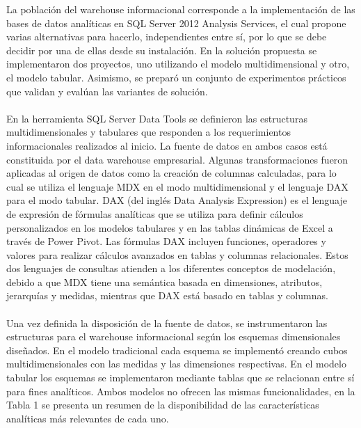 \documentclass[preprint,12pt]{elsarticle}
\begin{document}
La  población  del  warehouse  informacional  corresponde  a  la  implementación  de  las  bases  de  datos analíticas  en  SQL  Server  2012  Analysis  Services,  el  cual  propone  varias  alternativas  para  hacerlo, independientes entre sí, por lo que se debe decidir por una de ellas desde su instalación. En la solución propuesta se implementaron dos proyectos, uno utilizando el modelo multidimensional y otro, el modelo tabular. Asimismo, se preparó un conjunto de experimentos prácticos que validan y evalúan las variantes de solución.  \\ 
\\
En la herramienta SQL Server Data Tools se definieron las estructuras multidimensionales y tabulares que responden a los requerimientos informacionales realizados al inicio. La fuente de datos en ambos casos está constituida por el data warehouse empresarial. Algunas transformaciones fueron aplicadas al origen de datos como la creación de columnas calculadas, para lo cual se utiliza el lenguaje MDX en el modo multidimensional y el lenguaje DAX para el modo tabular. DAX (del inglés Data Analysis Expression) es el lenguaje de expresión de fórmulas analíticas que se utiliza para definir cálculos personalizados en los modelos  tabulares  y en  las  tablas  dinámicas de  Excel  a  través de  Power  Pivot.  Las  fórmulas  DAX incluyen  funciones,  operadores  y  valores  para  realizar  cálculos  avanzados  en  tablas  y  columnas relacionales. Estos dos lenguajes de consultas atienden a los diferentes conceptos de modelación, debido a que MDX tiene una semántica basada en dimensiones, atributos, jerarquías y medidas, mientras que DAX está basado en tablas y columnas.   \\
\\
Una vez definida la disposición de la fuente de datos, se instrumentaron las estructuras para el warehouse informacional según los esquemas dimensionales diseñados. En el modelo tradicional cada esquema se implementó  creando  cubos  multidimensionales  con las  medidas  y  las dimensiones  respectivas.  En  el modelo  tabular los  esquemas  se implementaron  mediante tablas  que  se relacionan  entre  sí para  fines analíticos. Ambos modelos no ofrecen las mismas funcionalidades, en la Tabla 1 se presenta un resumen de la disponibilidad de las características analíticas más relevantes de cada uno.
\end{document}
